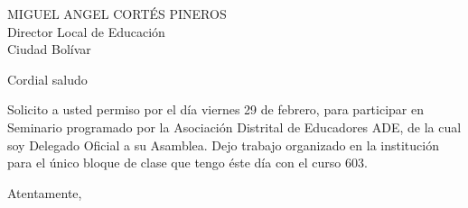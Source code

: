 \documentclass[letterpaper,spanish]{letter}
\date{28 de enero de 2016}
\begin{document}
\begin{letter}{MIGUEL ANGEL CORTÉS PINEROS\\Director Local de Educación\\Ciudad Bolívar}
	
\opening{Cordial saludo}
Solicito a usted permiso por el día viernes 29 de febrero, para participar en Seminario programado por la Asociación Distrital de Educadores ADE, de la cual soy Delegado Oficial a su Asamblea. Dejo trabajo organizado en la institución para el único bloque de clase que tengo éste día con el curso 603.
\closing{Atentamente,}


\end{letter}
\end{document}
